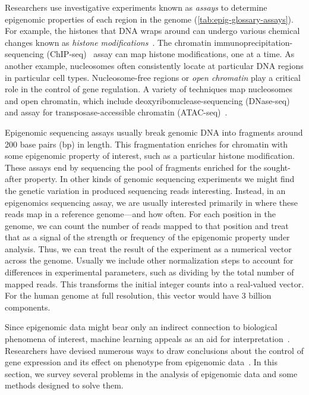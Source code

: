 \documentclass[5p]{elsarticle}
\newcommand{\rev}[1]{{\color{black}#1}}
\begin{document}
Researchers use investigative experiments known as \emph{assays} to determine epigenomic properties of each region in the genome (\autoref{tab:epig-glossary-assays}).
For example, the histones \rev{that DNA wraps} around can undergo various chemical changes known as \emph{histone modifications}~\cite{Rothbart2014InterpretingModifications}.
The chromatin immunoprecipitation-sequencing (ChIP-seq)~\cite{Johnson2007Genome-wideInteractions,Robertson2007Genome-wideSequencing,Barski2007High-ResolutionGenome,Mikkelsen2007Genome-wideCells} assay can map histone modifications, one at a time.
As another example, nucleosomes often consistently locate at particular DNA regions in particular cell types.
Nucle\-osome-free regions or \emph{open chromatin} play a critical role in the control of gene regulation.
A variety of techniques map nucleosomes and open chromatin, which include deoxyribonuclease-sequencing (DNase-seq)~\cite{Song2010DNase-seq:Cells} and assay for transposase-accessible chromatin (ATAC-seq)~\cite{Buenrostro2013TranspositionPosition}.

Epigenomic sequencing assays usually break genomic DNA into fragments around 200 \rev{base pairs (bp)} in length. 
This fragmentation enriches for chromatin with some epigenomic property of interest, such as a particular histone modification.
These assays end by sequencing the pool of fragments enriched for the sought-after property.
In other kinds of \rev{genomic} sequencing experiments we might find the genetic variation in produced sequencing reads interesting.
Instead, in an epigenomics sequencing assay, we are usually interested primarily in where these reads map in a reference genome---and how often.
For each position in the genome, we can count the number of reads mapped to that position and treat that as a signal of the strength or frequency of the epigenomic property under analysis.
Thus, we can treat the result of the experiment as a numerical vector across the genome.
Usually we include other normalization steps to account for differences in experimental parameters, such as dividing by the total number of mapped reads.
This transforms the initial integer counts into a real-valued vector.
For the human genome at full resolution, this vector would have 3 billion components.

Since epigenomic data might bear only an indirect connection to biological phenomena of interest, machine learning appeals as an aid for interpretation~\cite{Holder2017MachineApplications}.
Researchers have devised numerous ways to draw conclusions about the control of gene expression and its effect \rev{on} phenotype from epigenomic data~\cite{Widschwendter2018Epigenome-basedChallenges,Stricker2017FromEpigenomics}.
In this section, we survey several problems in the analysis of epigenomic data and some methods designed to solve them.
\end{document}

